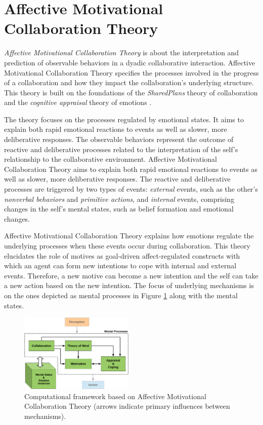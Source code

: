 \documentclass[journal, 11pt]{IEEEtran}
\begin{document}
\section{{\fontsize{11.5}{9}\selectfont Affective Motivational Collaboration
Theory}}
\label{sec:amct}

\textit{Affective Motivational Collaboration Theory} is about the interpretation
and prediction of observable behaviors in a dyadic collaborative interaction.
Affective Motivational Collaboration Theory specifies the processes involved in
the progress of a collaboration and how they impact the collaboration's
underlying structure. This theory is built on the foundations of the
\textit{SharedPlans} theory of collaboration \cite{grosz:plans-discourse} and
the \textit{cognitive appraisal} theory of emotions
\cite{gratch:domain-independent}.

The theory focuses on the processes regulated by emotional states. It aims to
explain both rapid emotional reactions to events as well as slower, more
deliberative responses. The observable behaviors represent the outcome of
reactive and deliberative processes related to the interpretation of the self's
relationship to the collaborative environment. Affective Motivational
Collaboration Theory aims to explain both rapid emotional reactions to events as
well as slower, more deliberative responses. The reactive and deliberative
processes are triggered by two types of events: \textit{external} events, such
as the other's \textit{nonverbal behaviors} and \textit{primitive actions}, and
\textit{internal} events, comprising changes in the self's mental states, such
as belief formation and emotional changes.

Affective Motivational Collaboration Theory explains how emotions regulate the
underlying processes when these events occur during collaboration. This theory
elucidates the role of motives as goal-driven affect-regulated constructs with
which an agent can form new intentions to cope with internal and external
events. Therefore, a new motive can become a new intention and the self can take
a new action based on the new intention.  The focus of underlying mechanisms is
on the ones depicted as mental processes in Figure \ref{fig:cpm} along with the
mental states.

\begin{figure}[tbh]
  \centering
  \includegraphics[width=0.485\textwidth]{figs/theory-general-croped.pdf}
  \caption{{\fontsize{10}{10}\selectfont Computational framework based on
  Affective Motivational Collaboration Theory (arrows indicate primary
  influences between mechanisms).}}
  \label{fig:cpm}
\end{figure}
\end{document}
